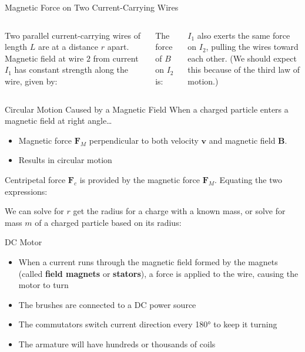 \documentclass[12pt,aspectratio=169]{beamer}
\begin{document}
\begin{frame}{Magnetic Force on Two Current-Carrying Wires}
  \begin{columns}

    Two parallel current-carrying wires of length $L$ are at a distance $r$
    apart. Magnetic field at wire $2$ from current $I_1$ has constant strength
    along the wire, given by:


    The force of $B$ on $I_2$ is:


    \vspace{-.1in}$I_1$ also exerts the same force on $I_2$, pulling the wires
    toward each other. (We should expect this because of the third law of
    motion.)
  \end{columns}
\end{frame}



\begin{frame}{Circular Motion Caused by a Magnetic Field}
  When a charged particle enters a magnetic field at right angle\ldots
  \begin{itemize}
  \item Magnetic force $\bm{F}_M$ perpendicular to both velocity $\bm{v}$ and
    magnetic field $\bm{B}$.
  \item Results in circular motion
  \end{itemize}
  Centripetal force $\bm{F}_c$ is provided by the magnetic force $\bm{F}_M$.
  Equating the two expressions:

  
  We can solve for $r$ get the radius for a charge with a known
  mass, or solve for mass $m$ of a charged particle based on its radius:  

\end{frame}



\begin{frame}{DC Motor}
  \begin{center}
  \end{center}
  \begin{itemize}
  \item When a current runs through the magnetic field formed by the magnets
    (called \textbf{field magnets} or \textbf{stators}), a force is applied
    to the wire, causing the motor to turn
  \item The brushes are connected to a DC power source
  \item The commutators switch current direction every
    \ang{180} to keep it turning
  \item The armature will have hundreds or thousands of coils
  \end{itemize}
\end{frame}
\end{document}
